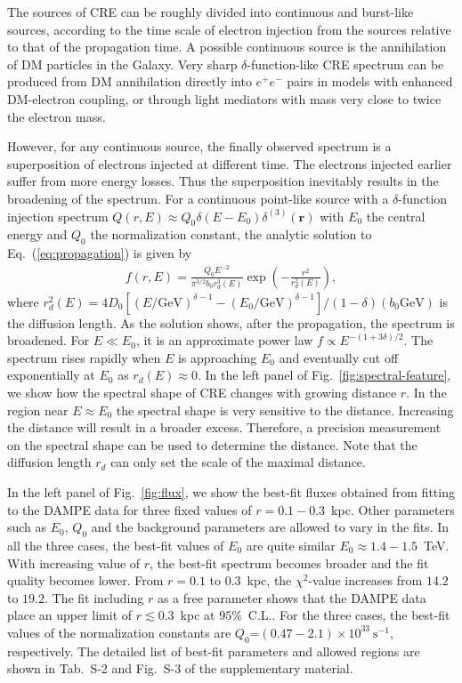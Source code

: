 \documentclass[aps,prl,twocolumn,a4paper]{revtex4}
\newcommand{\note}[1]{#1}{\ignorespacesafterend}
\newcommand{\fig}[1]{Fig.~\ref{#1}}
\newcommand{\eq}[1]{Eq.~(\ref{#1})}
\begin{document}
The sources of CRE can be roughly divided into 
continuous  and burst-like sources,
according to the time scale of  electron injection from the sources relative to that of  the propagation time.
A possible continuous source  is the annihilation of DM particles in the Galaxy.
Very sharp $\delta$-function-like CRE spectrum can be produced from
DM annihilation directly into  $e^{+}e^{-}$ pairs 
\note{in models with  enhanced DM-electron coupling,
or  through light mediators with mass very close
to twice the electron mass.
}
However, for any continuous source, the finally observed spectrum is
a superposition of electrons injected at different time.
The electrons injected earlier suffer from more energy losses.
Thus the superposition inevitably results in the broadening of  the spectrum.
For a continuous point-like source
with a $\delta$-function injection spectrum
$Q(r,E) \approx Q_{0}\delta(E-E_{0})\delta^{(3)}(\mathbf{r})$
with $E_{0}$ the central energy and  $Q_{0}$ the normalization constant,
the analytic solution to  \eq{eq:propagation} is  given by
\cite{
	Atoian:1995ux%
}
\begin{align}\label{eq:continuous-point-solution}
f(r,E)=\frac{Q_{0} E^{-2}}{\pi^{3/2}b_{0} 
	r^{3}_{d}(E)}\exp\left(-\frac{r^{2}}{r^{2}_{d}(E)}\right)  ,
\end{align}
where 
$r^{2}_{d}(E)=4 D_{0}
[(E/\mbox{GeV})^{\delta-1}-(E_{0}/\mbox{GeV})^{\delta-1}]/(1-\delta) (b_{0}\text{GeV})$ 
is the diffusion length.
As the solution shows,  after the propagation, 
the  spectrum is broadened.
For $E\ll E_{0}$, it is  
an approximate power law  $f\propto E^{-(1+3\delta)/2}$.
The spectrum rises rapidly when $E$ is approaching $E_{0}$ and 
eventually  cut off exponentially at $E_{0}$ as $r_{d}(E)\approx 0$.
In the left panel of \fig{fig:spectral-feature}, we show how the 
spectral shape of CRE changes with growing distance $r$. 
In the region near  $E\approx E_{0}$  
the spectral shape is very sensitive to the distance.
Increasing the  distance will  result in a broader excess. 
Therefore,  a precision measurement on the spectral shape can be used to 
determine the distance. 
Note that the diffusion length $r_{d}$ 
can only set the scale of the maximal distance.

In the left panel of \fig{fig:flux},
we show the best-fit fluxes obtained from fitting to the DAMPE data 
for three fixed values of  $r=0.1-0.3$~kpc. 
Other parameters such as $E_{0}$, $Q_{0}$ and the background parameters
are allowed to vary in the fits.
In all the  three cases, the best-fit values of $E_{0}$ are quite similar 
$E_{0}\approx1.4-1.5$~TeV. 
With increasing value of $r$, the best-fit spectrum becomes broader and  
the fit  quality becomes lower.
From $r=0.1$ to 0.3~kpc, the $\chi^{2}$-value increases from  $14.2$ to $19.2$.
The fit including  $r$ as a free parameter shows  that 
the DAMPE data place an upper limit of 
$r \lesssim 0.3$~kpc at $95\%$~C.L.. 
For the three cases, the best-fit values of the normalization constants are $Q_{0}$=$(0.47-2.1)\times 10^{33}~\mbox{s}^{-1}$, respectively.
The detailed list of best-fit parameters and allowed regions are shown 
in Tab.~S-2 and Fig.~S-3
of the supplementary material. 
\end{document}
